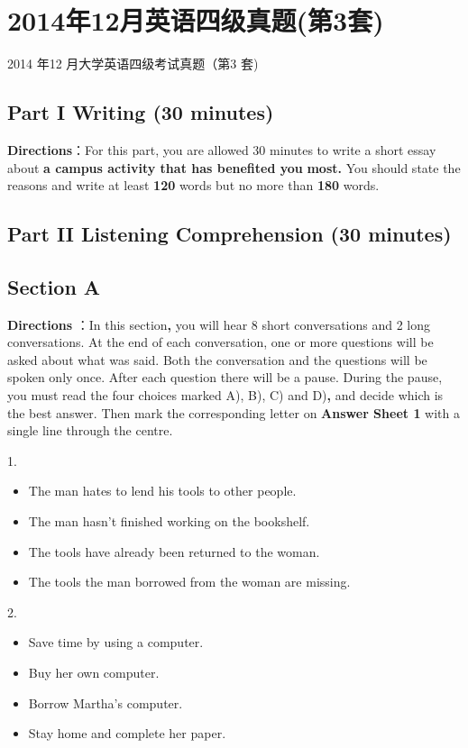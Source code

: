 \documentclass[UTF8,11pt]{ctexart}
\begin{document}
\section*{2014年12月英语四级真题(第3套)}
2014 年12 月大学英语四级考试真题（第3 套)


\subsection*{Part I Writing (30 minutes)}


\textbf{Directions}：For this part, you are allowed 30 minutes to write a short essay about\textbf{ a campus activity that has benefited you} \textbf{most.} You should state the reasons and write at least\textbf{ 120} words but no more than\textbf{ 180} words.


\subsection*{Part II Listening Comprehension (30 minutes)}


\subsection*{Section A}


\textbf{Directions} ：In this section\textbf{,} you will hear 8 short conversations and 2 long conversations. At the end of each conversation, one or more questions will be asked about what was said. Both the conversation and the questions will be spoken only once. After each question there will be a pause. During the pause, you must read the four choices marked A), B), C) and D)\textbf{,} and decide which is the best answer. Then mark the corresponding letter on\textbf{ Answer Sheet 1} with a single line through the centre.


1.


\begin{itemize}[leftmargin=2em,itemsep=.2em,topsep=.4em]\item[A.] The man hates to lend his tools to other people.
\item[B.] The man hasn’t finished working on the bookshelf.
\item[C.] The tools have already been returned to the woman.
\item[D.] The tools the man borrowed from the woman are missing.
\end{itemize}

2.


\begin{itemize}[leftmargin=2em,itemsep=.2em,topsep=.4em]\item[A.] Save time by using a computer.
\item[B.] Buy her own computer.
\item[C.] Borrow Martha’s computer.
\item[D.] Stay home and complete her paper.
\end{itemize}
\end{document}
